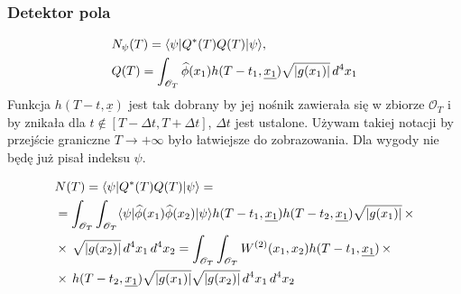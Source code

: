 \documentclass[10pt,t]{beamer}
\begin{document}
\begin{frame}
  \frametitle{Detektor pola}

  \vspace{-2em}


  \begin{subequations}
    \begin{align}
      \label{eq:Promieniowanie-Hawkinga-25-A}
      &N_{ \psi }( T ) = \langle \psi | Q^{ * }( T ) Q( T )  | \psi \rangle, \\
      \label{eq:Promieniowanie-Hawkinga-25-B}
      &Q( T ) =
        \int_{ \mathcal{O}_{ T } } \widehat{\phi}( x_{ 1 } )
        h( T - t_{ 1 }, \underline{x_{ 1 }} )
        \sqrt{ | g( x_{ 1 } ) | } \, d^{ 4 }x_{ 1 }
    \end{align}
  \end{subequations}
  Funkcja $h( T - t, \underline{x} )$ jest tak dobrany by jej nośnik
  zawierała się w zbiorze $\mathcal{O}_{ T }$ i by znikała dla
  $t \notin [ T - \Delta t, T + \Delta t]$, $\Delta t$ jest ustalone.
  Używam takiej notacji by przejście graniczne $T \to +\infty$ było
  łatwiejsze do zobrazowania. Dla wygody nie będę już pisał indeksu
  $\psi$.

  \vspace{-1em}


  \begin{equation}
    \label{eq:Promieniowanie-Hawkinga-26}
    \begin{split}
      &N( T ) = \langle \psi | Q^{ * }( T ) Q( T ) | \psi \rangle = \\
      &= \int_{ \mathcal{O}_{ T } } \int_{ \mathcal{O}_{ T } } \langle \psi | \widehat{\phi}( x_{ 1 } )
        \widehat{\phi}( x_{ 2 } ) | \psi \rangle
        h( T - t_{ 1 }, \underline{x_{ 1 }} ) h( T - t_{ 2 },
        \underline{x_{ 1 }} ) \sqrt{ | g( x_{ 1 } ) | } \, \times \\
      &\times \, \sqrt{ | g( x_{ 2 } ) | } \, d^{ 4 }x_{ 1 }\, d^{ 4 }x_{ 2 } =
        \int_{ \mathcal{O}_{ T } } \int_{ \mathcal{O}_{ T } } W^{ ( 2 ) }( x_{ 1 }, x_{ 2 } )
      h( T - t_{ 1 }, \underline{x_{ 1 }} ) \, \times \\
      &\times \, h( T - t_{ 2 }, \underline{x_{ 1 }} )
        \sqrt{ | g( x_{ 1 } ) | } \sqrt{ | g( x_{ 2 } ) | } \,
        d^{ 4 }x_{ 1 }\, d^{ 4 }x_{ 2 }
    \end{split}
  \end{equation}

\end{frame}
\end{document}
